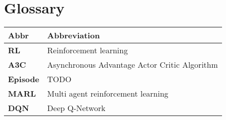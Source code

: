 %
%

\chapter*{Glossary}\label{chap.glossar}
\label{cha:abkürzungsverzeichnis}


\begin{longtable}{|m{3cm}|m{11cm}|}\hline	
	\rowcolor{gray} \textbf{Abbr}&
	Abbreviation \\ \hline

	\textbf{RL}&
	Reinforcement learning \\ \hline

	\textbf{A3C}&
	 Asynchronous Advantage Actor Critic Algorithm \\ \hline

	\textbf{Episode}&
	TODO \\ \hline

	\textbf{MARL}&
	Multi agent reinforcement learning \\ \hline

	\textbf{DQN}&
	Deep Q-Network \\ \hline
	
\end{longtable}
